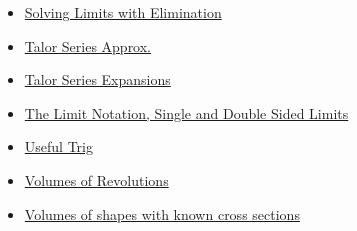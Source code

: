 \documentclass[11pt]{article}
\begin{document}
\begin{itemize}
\begin{itemize}
\begin{itemize}
\item \href{mathematics/single\_variable\_calculus/KBhMATH401LimitsEliminationMethod.org}{Solving Limits with Elimination}
\item \href{mathematics/single\_variable\_calculus/KBhMATH401TaylorSeriesApprox.org}{Talor Series Approx.}
\item \href{mathematics/single\_variable\_calculus/KBhMATH401SequencesAndSeries.org}{Talor Series Expansions}
\item \href{mathematics/single\_variable\_calculus/KBhMATH401TheLimitNotation.org}{The Limit Notation, Single and Double Sided Limits}
\item \href{mathematics/single\_variable\_calculus/KBhMATH401UsefulTrig.org}{Useful Trig}
\item \href{mathematics/single\_variable\_calculus/KBe21math401retHandout26VolumesOfRevolutions.org}{Volumes of Revolutions}
\item \href{mathematics/single\_variable\_calculus/KBe21math401retCrossSectionVolumes.org}{Volumes of shapes with known cross sections}
\end{itemize}
\end{itemize}
\end{itemize}
\end{document}
